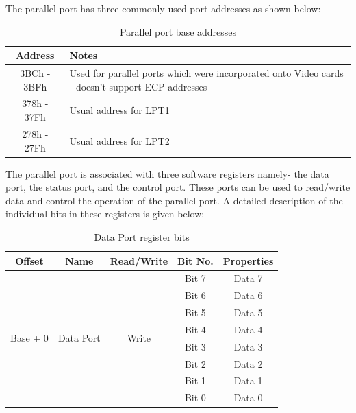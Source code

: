 \documentclass[a4paper,28pt,twoside,openright]{report}
\begin{document}
The parallel port has three commonly used port addresses as shown below:

\newpage
\begin{table}[h]
\centering
\bgroup
\def\arraystretch{1.5}
\begin{tabular}{ |c|p{7cm}| }
\hline
\textbf{Address} & \textbf{Notes}\\
\hline
3BCh - 3BFh & Used for parallel ports which were incorporated onto Video cards - doesn't support ECP addresses\\
\hline
378h - 37Fh & Usual address for LPT1\\
\hline
278h - 27Fh & Usual address for LPT2\\
\hline
\end{tabular}
\caption{Parallel port base addresses}
\egroup
\end{table}

The parallel port is associated with three software registers namely- the data port, the status port, and the control port.
These ports can be used to read/write data and control the operation of the parallel port. A detailed description of the individual bits in these registers is given below:

\begin{table}[h]
\centering
\bgroup
\def\arraystretch{1.5}
\begin{tabular}{|c|c|c|c|c|}
\hline
\textbf{Offset}           & \textbf{Name}              & \textbf{Read/Write}    & \textbf{Bit No.} & \textbf{Properties} \\ \hline
\multirow{8}{*}{Base + 0} & \multirow{8}{*}{Data Port} & \multirow{8}{*}{Write} & Bit 7            & Data 7              \\ \cline{4-5} 
                          &                            &                        & Bit 6            & Data 6              \\ \cline{4-5} 
                          &                            &                        & Bit 5            & Data 5              \\ \cline{4-5} 
                          &                            &                        & Bit 4            & Data 4              \\ \cline{4-5} 
                          &                            &                        & Bit 3            & Data 3              \\ \cline{4-5} 
                          &                            &                        & Bit 2            & Data 2              \\ \cline{4-5} 
                          &                            &                        & Bit 1            & Data 1              \\ \cline{4-5} 
                          &                            &                        & Bit 0            & Data 0              \\ \hline
\end{tabular}
\caption{Data Port register bits}
\egroup
\end{table}
\end{document}
